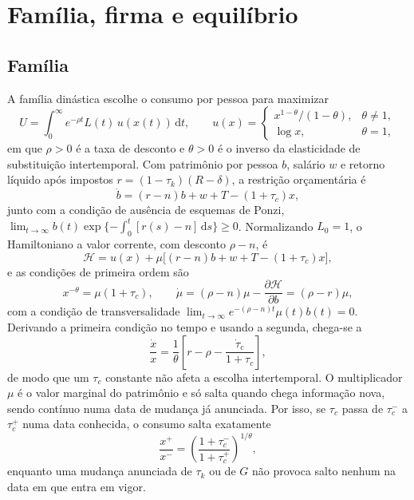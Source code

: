 \documentclass[11pt,a4paper]{article}
\newcommand{\dd}{\,\mathrm{d}}
\begin{document}
\section{Família, firma e equilíbrio}

\subsection{Família}
A família dinástica escolhe o consumo por pessoa para maximizar
\begin{equation}
 U=\int_0^\infty e^{-\rho t}L(t)\,u(x(t))\dd t,
 \qquad
 u(x)=\begin{cases}x^{1-\theta}/(1-\theta),&\theta\neq1,\\ \log x,&\theta=1,\end{cases}
 \label{eq:utilidade}
\end{equation}
em que $\rho>0$ é a taxa de desconto e $\theta>0$ é o inverso da elasticidade
de substituição intertemporal. Com patrimônio por pessoa $b$, salário $w$ e
retorno líquido após impostos $r=(1-\tau_k)(R-\delta)$, a restrição
orçamentária é
\begin{equation}
 \dot b=(r-n)b+w+T-(1+\tau_c)x,
 \label{eq:orcamento}
\end{equation}
junto com a condição de ausência de esquemas de Ponzi,
$\lim_{t\to\infty}b(t)\exp\{-\int_0^t[r(s)-n]\dd s\}\ge0$.
Normalizando $L_0=1$, o Hamiltoniano a valor corrente, com desconto $\rho-n$,
é
\[
 \mathcal H=u(x)+\mu\bigl[(r-n)b+w+T-(1+\tau_c)x\bigr],
\]
e as condições de primeira ordem são
\begin{equation}
 x^{-\theta}=\mu(1+\tau_c),\qquad
 \dot\mu=(\rho-n)\mu-\frac{\partial\mathcal H}{\partial b}=(\rho-r)\mu,
 \label{eq:cpo}
\end{equation}
com a condição de transversalidade
$\lim_{t\to\infty}e^{-(\rho-n)t}\mu(t)b(t)=0$. Derivando a primeira condição
no tempo e usando a segunda, chega-se a
\begin{equation}
 \frac{\dot x}{x}=\frac1\theta\left[r-\rho-\frac{\dot\tau_c}{1+\tau_c}\right],
 \label{eq:euler}
\end{equation}
de modo que um $\tau_c$ constante não afeta a escolha intertemporal. O
multiplicador $\mu$ é o valor marginal do patrimônio e só salta quando chega
informação nova, sendo contínuo numa data de mudança já anunciada. Por isso,
se $\tau_c$ passa de $\tau_c^-$ a $\tau_c^+$ numa data conhecida, o consumo
salta exatamente
\begin{equation}
 \frac{x^+}{x^-}=\left(\frac{1+\tau_c^-}{1+\tau_c^+}\right)^{1/\theta},
 \label{eq:salto}
\end{equation}
enquanto uma mudança anunciada de $\tau_k$ ou de $G$ não provoca salto nenhum
na data em que entra em vigor.
\end{document}
